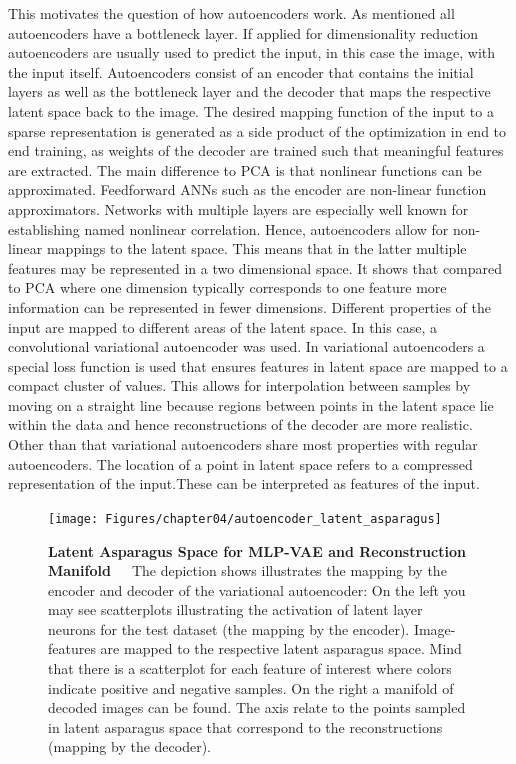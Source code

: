 This motivates the question of how autoencoders work. As mentioned all autoencoders have a bottleneck layer. If applied for dimensionality reduction autoencoders are usually used to predict the input, in this case the image, with the input itself. Autoencoders consist of an encoder that contains the initial layers as well as the bottleneck layer and the decoder that maps the respective latent space back to the image. The desired mapping function of the input to a sparse representation is generated as a side product of the optimization in end to end training, as weights of the decoder are trained such that meaningful features are extracted. The main difference to PCA is that nonlinear functions can be approximated. Feedforward ANNs such as the encoder are non-linear function approximators. Networks with multiple layers are especially well known for establishing named nonlinear correlation. Hence, autoencoders allow for non-linear mappings to the latent space. This means that in the latter multiple features may be represented in a two dimensional space. It shows that compared to PCA where one dimension typically corresponds to one feature more information can be represented in fewer dimensions. Different properties of the input are mapped to different areas of the latent space. In this case, a convolutional variational autoencoder was used. In variational autoencoders a special loss function is used that ensures features in latent space are mapped to a compact cluster of values. This allows for interpolation between samples by moving on a straight line because regions between points in the latent space lie within the data and hence reconstructions of the decoder are more realistic. Other than that variational autoencoders share most properties with regular autoencoders. The location of a point in latent space refers to a compressed representation of the input.These can be interpreted as features of the input. \\
\begin{figure}[h]
	\centering
	\texttt{[image: Figures/chapter04/autoencoder\_latent\_asparagus]}
	\decoRule
	\caption[Latent Asparagus Space for MLP-VAE and Reconstruction Manifold]{\textbf{Latent Asparagus Space for MLP-VAE and Reconstruction Manifold}~~~The depiction shows illustrates the mapping by the encoder and decoder of the variational autoencoder: On the left you may see scatterplots illustrating the activation of latent layer neurons for the test dataset (the mapping by the encoder). Image-features are mapped to the respective latent asparagus space. Mind that there is a scatterplot for each feature of interest where colors indicate positive and negative samples. On the right a manifold of decoded images can be found. The axis relate to the points sampled in latent asparagus space that correspond to the reconstructions (mapping by the decoder).}
	\label{fig:AutoencoderLatentSpace}
\end{figure}
